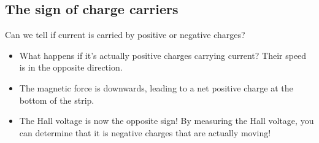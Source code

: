 \documentclass[aspectratio=169,
hyperref={colorlinks,urlcolor=blue}
]{beamer}
\begin{document}
\subsection{The sign of charge carriers}
\label{subsec:thesignofchargecarriers}
{
Can we tell if current is carried by positive or negative charges?
\begin{itemize}
\item<1-> What happens if it's actually positive charges carrying current? Their speed is in the opposite direction.
\item<2-> The magnetic force is downwards, leading to a net positive charge at the bottom of the strip. 
\item<3-> The Hall voltage is now the opposite sign! By measuring the Hall voltage, you can determine that it is negative charges that are actually moving!
\end{itemize}

}
\end{document}
